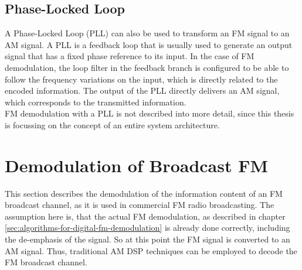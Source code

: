 \subsection{Phase-Locked Loop}

A Phase-Locked Loop (PLL) can also be used to transform an FM signal to an AM signal.
A PLL is a feedback loop that is usually used to generate an output signal that has a fixed phase reference to its input.
In the case of FM demodulation, the loop filter in the feedback branch is configured to be able to follow the frequency variations on the input, which is directly related to the encoded information.
The output of the PLL directly delivers an AM signal, which corresponds to the transmitted information. \cite{SchnyderHaller2002}\\

FM demodulation with a PLL is not described into more detail, since this thesis is focussing on the concept of an entire system architecture.

\section{Demodulation of Broadcast FM}
\label{sec:demodulation-of-broadcast-fm}

This section describes the demodulation of the information content of an FM broadcast channel, as it is used in commercial FM radio broadcasting.
The assumption here is, that the actual FM demodulation, as described in chapter \ref{sec:algorithms-for-digital-fm-demodulation} is already done correctly, including the de-emphasis of the signal.
So at this point the FM signal is converted to an AM signal.
Thus, traditional AM DSP techniques can be employed to decode the FM broadcast channel.\\


